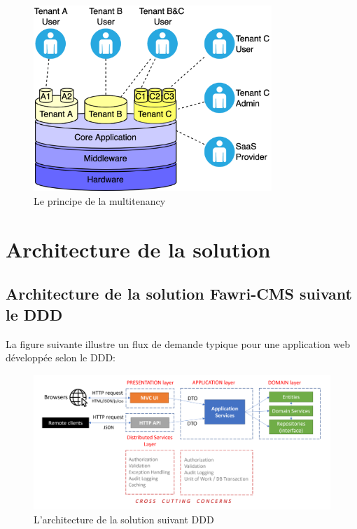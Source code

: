\begin{figure}[H] 
    \centering
    \includegraphics[width=9cm]{Figures/multytenancy.png}
        \caption{Le principe de la multitenancy}
\end{figure}

\section{Architecture de la solution}

\subsection{Architecture de la solution Fawri-CMS suivant le DDD}

\hspace{\parindent}La figure suivante illustre un flux de demande typique pour une application web développée selon le DDD:


\begin{figure}[H] 
    \centering
    \includegraphics[width=17cm]{Figures/DDD flow.png}
        \caption{L'architecture de la solution suivant DDD }
\end{figure}


